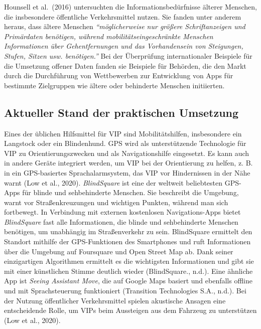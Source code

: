 \documentclass[
]{book}
\begin{document}
Hounsell et al.~(2016) untersuchten die Informationsbedürfnisse älterer Menschen, die insbesondere öffentliche Verkehrsmittel nutzen. Sie fanden unter anderem heraus, dass ältere Menschen \emph{``möglicherweise nur größere Schriftanzeigen und Primärdaten benötigen, während mobilitätseingeschränkte Menschen Informationen über Gehentfernungen und das Vorhandensein von Steigungen, Stufen, Sitzen usw. benötigen.''} Bei der Überprüfung internationaler Beispiele für die Umsetzung offener Daten fanden sie Beispiele für Behörden, die den Markt durch die Durchführung von Wettbewerben zur Entwicklung von Apps für bestimmte Zielgruppen wie ältere oder behinderte Menschen initiierten.

\hypertarget{aktueller-stand-der-praktischen-umsetzung-27}{%
\subsection*{Aktueller Stand der praktischen Umsetzung}\label{aktueller-stand-der-praktischen-umsetzung-27}}

Eines der üblichen Hilfsmittel für VIP sind Mobilitätshilfen, insbesondere ein Langstock oder ein Blindenhund. GPS wird als unterstützende Technologie für VIP zu Orientierungszwecken und als Navigationshilfe eingesetzt. Es kann auch in andere Geräte integriert werden, um VIP bei der Orientierung zu helfen, z. B. in ein GPS-basiertes Sprachalarmsystem, das VIP vor Hindernissen in der Nähe warnt (Low et al., 2020). \emph{BlindSquare} ist eine der weltweit beliebtesten GPS-Apps für blinde und sehbehinderte Menschen. Sie beschreibt die Umgebung, warnt vor Straßenkreuzungen und wichtigen Punkten, während man sich fortbewegt. In Verbindung mit externen kostenlosen Navigations-Apps bietet \emph{BlindSquare} fast alle Informationen, die blinde und sehbehinderte Menschen benötigen, um unabhängig im Straßenverkehr zu sein. BlindSquare ermittelt den Standort mithilfe der GPS-Funktionen des Smartphones und ruft Informationen über die Umgebung auf Foursquare und Open Street Map ab. Dank seiner einzigartigen Algorithmen ermittelt es die wichtigsten Informationen und gibt sie mit einer künstlichen Stimme deutlich wieder (BlindSquare., n.d.). Eine ähnliche App ist \emph{Seeing Assistant Move}, die auf Google Maps basiert und ebenfalls offline und mit Sprachsteuerung funktioniert (Transition Technologies S.A., n.d.). Bei der Nutzung öffentlicher Verkehrsmittel spielen akustische Ansagen eine entscheidende Rolle, um VIPs beim Aussteigen aus dem Fahrzeug zu unterstützen (Low et al., 2020).
\end{document}
